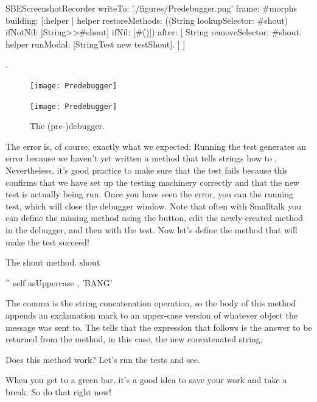 \documentclass[a4paper,10pt,twoside]{book}
\begin{document}
\begin{ExecuteSmalltalkScript}
SBEScreenshotRecorder writeTo: './figures/Predebugger.png' frame: #morphs building: [:helper |
	helper restoreMethods: ((String lookupSelector: #shout) ifNotNil: [{String>>#shout}] ifNil: [#()]) after: [
		String removeSelector: #shout.
		helper runModal: [StringTest new testShout].
	]
]
\end{ExecuteSmalltalkScript}.
\begin{figure}[hbt]
\ifluluelse
	{\centerline {\texttt{[image: Predebugger]}}}
	{\centerline {\texttt{[image: Predebugger]}}}
\caption{The (pre-)debugger.}
\label{fig:predebugger}
\end{figure}

The error is, of course, exactly what we expected:
Running the test generates an error because we haven't yet written a method that tells strings how to .
Nevertheless, it's good practice to make sure that the test fails because this confirms that we have set up the testing machinery correctly and that the new test is actually being run.
Once you have seen the error, you can  the running test, which will close the debugger window.
Note that often with Smalltalk you can define the missing method using the  button, edit the newly-created method in the debugger, and then  with the test.
Now let's define the method that will make the test succeed!

\begin{method}[shout]{The shout method.}
shout

    ^ self asUppercase , 'BANG'
\end{method}

The comma is the string concatenation operation, so the body of this method appends an exclamation mark to an upper-case version of whatever  object the  message was sent to.
The \ct{^} tells \sq that the expression that follows is the answer to be returned from the method, in this case, the new concatenated string.

Does this method work?
Let's run the tests and see.

When you get to a green bar\footnotemark, it's a good idea to save your work and take a break.
So do that right now!
\end{document}

